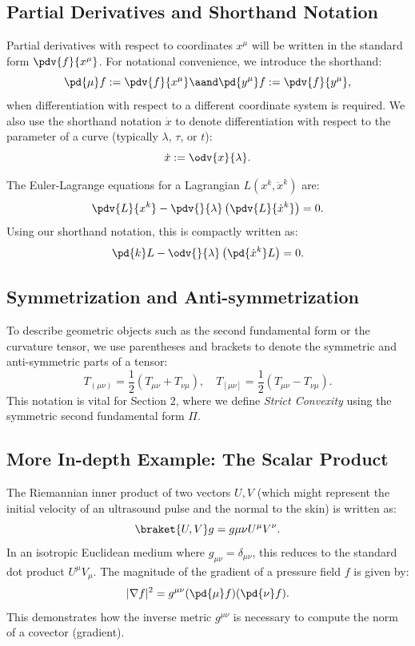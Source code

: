 \subsection{Partial Derivatives and Shorthand Notation} Partial derivatives with respect to coordinates $x^\mu$ will be written in the standard form $\pdv{f}{x^\mu}$. For notational convenience, we introduce the shorthand:
\[%
  \pd{\mu} f := \pdv{f}{x^\mu} \aand \pd{y^\mu} f := \pdv{f}{y^\mu}
,\]%
when differentiation with respect to a different coordinate system is required. We also use the shorthand notation $\dot{x}$ to denote differentiation with respect to the parameter of a curve (typically $\lambda$, $\tau$, or $t$):
\[%
  \dot{x} := \odv{x}{\lambda}
.\]%

\begin{example}
  The Euler-Lagrange equations for a Lagrangian $L(x^k, \dot{x}^k)$ are:
  \[%
    \pdv{L}{x^k} - \pdv{}{\lambda} \left(\pdv{L}{\dot{x}^k}\right) = 0
  .\]%
  Using our shorthand notation, this is compactly written as:
  \[%
    \pd{k} L - \odv{}{\lambda} \left(\pd{\dot{x}^k} L\right) = 0
  .\]%
\end{example}

\subsection{Symmetrization and Anti-symmetrization} To describe geometric objects such as the second fundamental form or the curvature tensor, we use parentheses and brackets to denote the symmetric and anti-symmetric parts of a tensor:
\[%
  T_{(\mu\nu)} = \frac{1}{2}(T_{\mu\nu} + T_{\nu\mu}), \quad T_{[\mu\nu]} = \frac{1}{2}(T_{\mu\nu} - T_{\nu\mu})
.\]%
This notation is vital for Section 2, where we define \emph{Strict Convexity} using the symmetric second fundamental form $\Pi$.

\subsection{More In-depth Example: The Scalar Product} The Riemannian inner product of two vectors $U, V$ (which might represent the initial velocity of an ultrasound pulse and the normal to the skin) is written as:
\[%
  \braket{U, V}g = g{\mu\nu} U^\mu V^\nu
.\]%
In an isotropic Euclidean medium where $g_{\mu\nu} = \delta_{\mu\nu}$, this reduces to the standard dot product $U^\mu V_\mu$. The magnitude of the gradient of a pressure field $f$ is given by:
\[%
  |\nabla f|^2 = g^{\mu\nu} (\pd{\mu} f) (\pd{\nu} f)
.\]%
This demonstrates how the inverse metric $g^{\mu\nu}$ is necessary to compute the norm of a covector (gradient).
